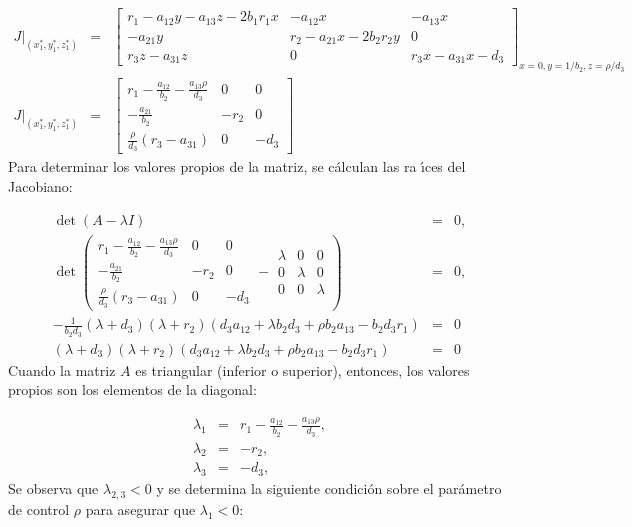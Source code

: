 \documentclass[letterpaper,11pt]{article}
\begin{document}
\begin{eqnarray*}
\left. J\right\vert _{(x_{1}^{\ast },y_{1}^{\ast },z_{1}^{\ast })} &=&\left[ 
\begin{array}{ccc}
r_{1}-a_{12}y-a_{13}z-2b_{1}r_{1}x & -a_{12}x & -a_{13}x \\ 
-a_{21}y & r_{2}-a_{21}x-2b_{2}r_{2}y & 0 \\ 
r_{3}z-a_{31}z & 0 & r_{3}x-a_{31}x-d_{3}%
\end{array}%
\right] _{x=0,y=1/b_{2},z=\rho /d_{3}} \\
\left. J\right\vert _{(x_{1}^{\ast },y_{1}^{\ast },z_{1}^{\ast })} &=&\left[ 
\begin{array}{ccc}
r_{1}-\frac{a_{12}}{b_{2}}-\frac{a_{13}\rho }{d_{3}} & 0 & 0 \\ 
-\frac{a_{21}}{b_{2}} & -r_{2} & 0 \\ 
\frac{\rho }{d_{3}}(r_{3}-a_{31}) & 0 & -d_{3}%
\end{array}%
\right]
\end{eqnarray*}%
Para determinar los valores propios de la matriz, se c\'{a}lculan las ra%
\'{\i}ces del Jacobiano:

\begin{eqnarray*}
\det (A-\lambda I) &=&0, \\
\det (%
\begin{array}{ccc}
r_{1}-\frac{a_{12}}{b_{2}}-\frac{a_{13}\rho }{d_{3}} & 0 & 0 \\ 
-\frac{a_{21}}{b_{2}} & -r_{2} & 0 \\ 
\frac{\rho }{d_{3}}(r_{3}-a_{31}) & 0 & -d_{3}%
\end{array}%
-%
\begin{array}{ccc}
\lambda & 0 & 0 \\ 
0 & \lambda & 0 \\ 
0 & 0 & \lambda%
\end{array}%
) &=&0, \\
-\frac{1}{b_{2}d_{3}}\left( \lambda +d_{3}\right) \left( \lambda
+r_{2}\right) \left( d_{3}a_{12}+\lambda b_{2}d_{3}+\rho
b_{2}a_{13}-b_{2}d_{3}r_{1}\right) \allowbreak &=&0 \\
\left( \lambda +d_{3}\right) \left( \lambda +r_{2}\right) \left(
d_{3}a_{12}+\lambda b_{2}d_{3}+\rho b_{2}a_{13}-b_{2}d_{3}r_{1}\right) &=&0
\end{eqnarray*}%
Cuando la matriz $A$ es triangular (inferior o superior), entonces, los
valores propios son los elementos de la diagonal:

\begin{eqnarray*}
\lambda _{1} &=&r_{1}-\frac{a_{12}}{b_{2}}-\frac{a_{13}\rho }{d_{3}}, \\
\lambda _{2} &=&-r_{2}, \\
\lambda _{3} &=&-d_{3},
\end{eqnarray*}%
Se observa que $\lambda _{2,3}<0$ y se determina la siguiente condici\'{o}n
sobre el par\'{a}metro de control $\rho $ para asegurar que $\lambda _{1}<0$:
\end{document}
